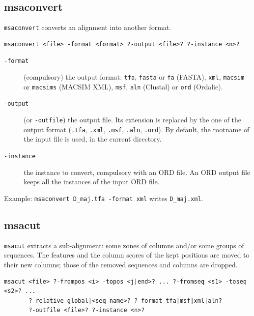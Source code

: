 \documentclass[a4paper]{article}
\begin{document}
\subsection{msaconvert}
\texttt{msaconvert} converts an alignment into another format.

\begin{verbatim}
msaconvert <file> -format <format> ?-output <file>? ?-instance <n>?
\end{verbatim}

\begin{description}
\item[\texttt{-format}] (compulsory) the output format: \texttt{tfa}, \texttt{fasta} or \texttt{fa} (FASTA), \texttt{xml}, \texttt{macsim} or \texttt{macsims} (MACSIM XML), \texttt{msf}, \texttt{aln} (Clustal) or \texttt{ord} (Ordalie).
\item[\texttt{-output}] (or \texttt{-outfile}) the output file. Its extension is replaced by the one of the output format (\texttt{.tfa}, \texttt{.xml}, \texttt{.msf}, \texttt{.aln}, \texttt{.ord}). By default, the rootname of the input file is used, in the current directory.
\item[\texttt{-instance}] the instance to convert, compulsory with an ORD file. An ORD output file keeps all the instances of the input ORD file.
\end{description}
Example: \texttt{msaconvert D\_maj.tfa -format xml} writes \texttt{D\_maj.xml}.

\subsection{msacut}
\texttt{msacut} extracts a sub-alignment: some zones of columns and/or some groups of sequences. The features and the column scores of the kept positions are moved to their new columns; those of the removed sequences and columns are dropped.

\begin{verbatim}
msacut <file> ?-frompos <i> -topos <j|end>? ... ?-fromseq <s1> -toseq <s2>? ...
       ?-relative global|<seq-name>? ?-format tfa|msf|xml|aln?
       ?-outfile <file>? ?-instance <n>?
\end{verbatim}
\end{document}
